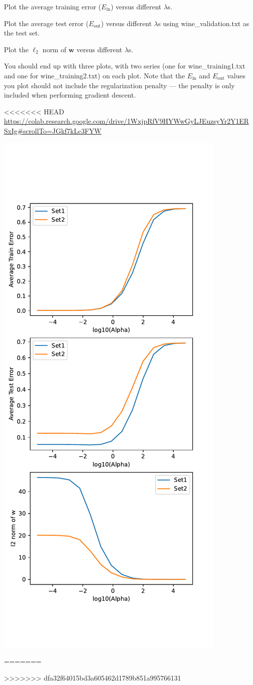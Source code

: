 \subproblem Plot the average training error ($E_\text{in}$) versus different $\lambda$s.

\subproblem Plot the average test error ($E_\text{out}$) versus different $\lambda$s using wine\_validation.txt as the test set.

\subproblem Plot the $\ell_2$ norm of $\mathbf{w}$ versus different $\lambda$s. \medskip

 You should end up with three plots, with two series (one for wine\_training1.txt and one for wine\_training2.txt) on each plot. Note that the $E_\text{in}$ and $E_\text{out}$ values you plot should not include the regularization penalty --- the penalty is only included when performing gradient descent.

\begin{solution}
<<<<<<< HEAD
  \url{https://colab.research.google.com/drive/1WxjpRfV9HYWwGyLJEuzsyYr2Y1ERSxIg#scrollTo=JGkf7kLc3FYW}
  \begin{center}
    \includegraphics[width=.47\textwidth]{prob2.pdf}
  \end{center}
=======

>>>>>>> dfa32f64015bd3a605462d1789b851a995766131
\end{solution}

